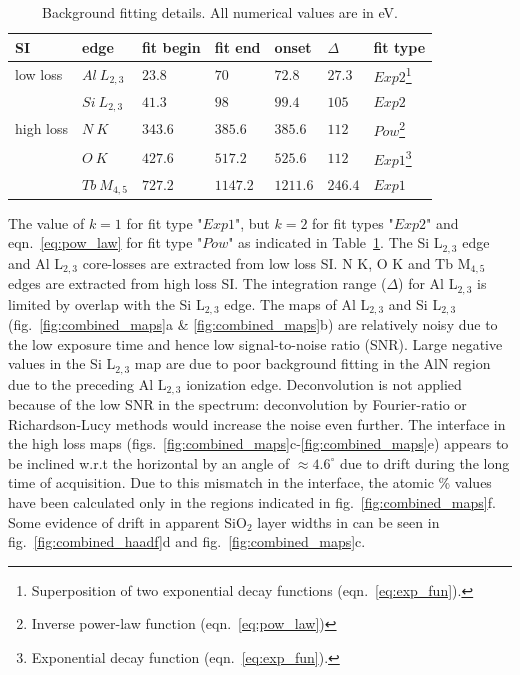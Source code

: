 \documentclass[%
aip,
rsi,%
 amsmath,amssymb,%
 reprint,%
]{revtex4-1}
\begin{document}
\begin{table}%
	\caption{Background fitting details. All numerical values are in eV.}
    \label{tab:back_fit_table}
    \begin{ruledtabular}
    	\begin{tabular}{lllllll}
    		SI	&edge	 &fit begin&fit end&onset&$\Delta$&fit type 	\\ \hline
            low loss&$Al~L_{2,3}$& $23.8$&$70$&$72.8$&$27.3$&$Exp2$\footnote{Superposition of two exponential decay functions (eqn.~\ref{eq:exp_fun}).} 		\\
            		&$Si~L_{2,3}$&$41.3$&$98$&$99.4$&$105$&$Exp2$ 			\\ \hline
            high loss&$N~K$&$343.6$&$385.6$&$385.6$&$112$&$Pow$\footnote{Inverse power-law function (eqn.~\ref{eq:pow_law})} 			\\
                	&$O~K$&$427.6$&$517.2$&$525.6$&$112$&$Exp1$\footnote{Exponential decay function (eqn.~\ref{eq:exp_fun}).} 			\\
            		&$Tb~M_{4,5}$&$727.2$&$1147.2$&$1211.6$&$246.4$&$Exp1$ 	\\
    	\end{tabular}
    \end{ruledtabular}
\end{table}
The value of $k = 1$ for fit type "$Exp1$", but $k = 2$ for fit types "$Exp2$" and eqn.~\ref{eq:pow_law} for fit type "$Pow$" as indicated in Table~\ref{tab:back_fit_table}. The Si L$_{2,3}$ edge and Al L$_{2,3}$ core-losses are extracted from low loss SI. N K, O K and Tb M$_{4,5}$ edges are extracted from high loss SI. The integration range ($\Delta$) for Al L$_{2,3}$ is limited by overlap with the Si L$_{2,3}$ edge. The maps of Al L$_{2,3}$ and Si L$_{2,3}$ (fig.~\ref{fig:combined_maps}a \& \ref{fig:combined_maps}b) are relatively noisy due to the low exposure time and hence low signal-to-noise ratio (SNR). Large negative values in the Si L$_{2,3}$ map are due to poor background fitting in the AlN region due to the preceding Al L$_{2,3}$ ionization edge. Deconvolution is not applied because of the low SNR in the spectrum: deconvolution by Fourier-ratio or Richardson-Lucy methods would increase the noise even further. The interface in the high loss maps (figs.~\ref{fig:combined_maps}c-\ref{fig:combined_maps}e) appears to be inclined w.r.t the horizontal by an angle of $\approx4.6^\circ$ due to drift during the long time of acquisition. Due to this mismatch in the interface, the atomic \% values have been calculated only in the regions indicated in fig.~\ref{fig:combined_maps}f. Some evidence of drift in apparent SiO$_2$ layer widths in can be seen in fig.~\ref{fig:combined_haadf}d and fig.~\ref{fig:combined_maps}c.
\end{document}

